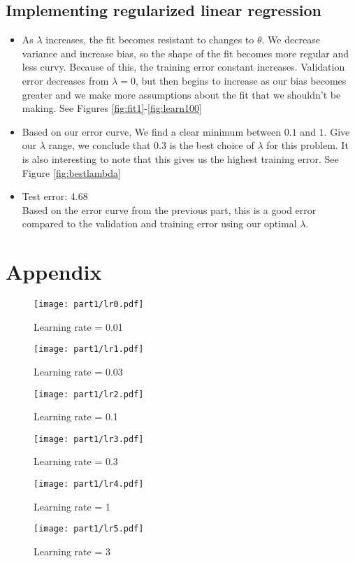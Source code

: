 \documentclass[pdftex,11pt]{article}
\begin{document}
\subsection{Implementing regularized linear regression}
\begin{itemize}
\item As $\lambda$ increases, the fit becomes resistant to changes to $\theta$. We decrease variance and increase bias, so the shape of the fit becomes more regular and less curvy. Because of this, the training error constant increases. Validation error decreases from $\lambda=0$, but then begins to increase as our bias becomes greater and we make more assumptions about the fit that we shouldn't be making. See Figures \ref{fig:fit1}-\ref{fig:learn100}
\item Based on our error curve, We find a clear minimum between $0.1$ and $1$. Give our $\lambda$ range, we conclude that $0.3$ is the best choice of $\lambda$ for this problem. It is also interesting to note that this gives us the highest training error. See Figure \ref{fig:bestlambda}
\item Test error: 4.68\\Based on the error curve from the previous part, this is a good error compared to the validation and training error using our optimal $\lambda$. 
\end{itemize}


\iffalse
\pagebreak
\section*{Appendix}
\begin{figure}[H]
  \caption{Learning rate = 0.01}
  \label{fig:lr001}
  \centering
    \texttt{[image: part1/lr0.pdf]}
\end{figure}
\begin{figure}[H]
  \caption{Learning rate = 0.03}
  \centering
    \texttt{[image: part1/lr1.pdf]}
\end{figure}
\begin{figure}[H]
  \caption{Learning rate = 0.1}
  \centering
    \texttt{[image: part1/lr2.pdf]}
\end{figure}
\begin{figure}[H]
  \caption{Learning rate = 0.3}
  \centering
    \texttt{[image: part1/lr3.pdf]}
\end{figure}
\begin{figure}[H]
  \caption{Learning rate = 1}
  \centering
    \texttt{[image: part1/lr4.pdf]}
\end{figure}
\begin{figure}[H]
  \caption{Learning rate = 3}
  \label{fig:lr3}
  \centering
    \texttt{[image: part1/lr5.pdf]}
\end{figure}
\end{document}
